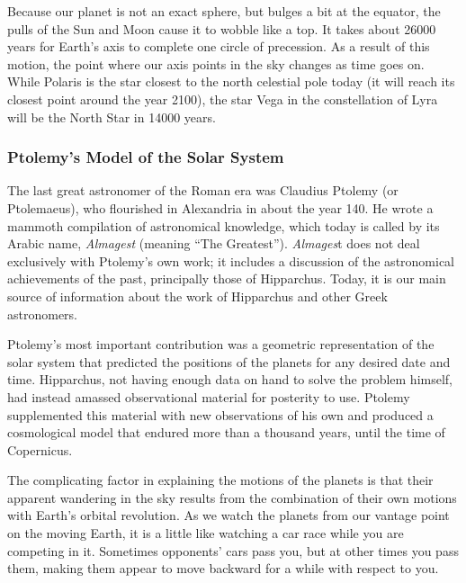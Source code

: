 \documentclass[../../main-astronomy.tex]{subfiles}
\begin{document}
\vspace{1em}


Because our planet is not an exact sphere, but bulges a bit at the equator, the pulls of the Sun and Moon cause it to wobble like a top. It takes about \num{26000} years for Earth's axis to complete one circle of precession. As a result of this motion, the point where our axis points in the sky changes as time goes on. While Polaris is the star closest to the north celestial pole today (it will reach its closest point around the year 2100), the star Vega in the constellation of Lyra will be the North Star in \num{14000} years.

\subsubsection*{Ptolemy's Model of the Solar System}

The last great astronomer of the Roman era was Claudius Ptolemy (or Ptolemaeus), who flourished in Alexandria in about the year 140. He wrote a mammoth compilation of astronomical knowledge, which today is called by its Arabic name, \textit{Almagest} (meaning ``The Greatest''). \textit{Almages}t does not deal exclusively with Ptolemy's own work; it includes a discussion of the astronomical achievements of the past, principally those of Hipparchus. Today, it is our main source of information about the work of Hipparchus and other Greek astronomers.

\vspace{1em}

Ptolemy's most important contribution was a geometric representation of the solar system that predicted the positions of the planets for any desired date and time. Hipparchus, not having enough data on hand to solve the problem himself, had instead amassed observational material for posterity to use. Ptolemy supplemented this material with new observations of his own and produced a cosmological model that endured more than a thousand years, until the time of Copernicus.

\vspace{1em}

The complicating factor in explaining the motions of the planets is that their apparent wandering in the sky results from the combination of their own motions with Earth's orbital revolution. As we watch the planets from our vantage point on the moving Earth, it is a little like watching a car race while you are competing in it. Sometimes opponents' cars pass you, but at other times you pass them, making them appear to move backward for a while with respect to you.
\end{document}
